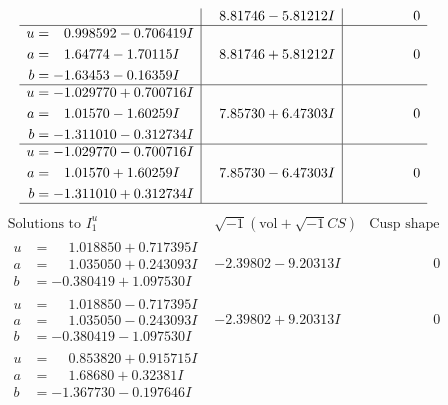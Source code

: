 \documentclass[1p]{elsarticle_modified}
\theoremstyle{definition}
\newcommand{\I}{\sqrt{-1}}
\begin{document}
$$\begin{array}{c|c|c}
 & \phantom{-}8.81746 - 5.81212 I & \phantom{-0.000000 } 0 \\ \hline\begin{aligned}
u &= \phantom{-}0.998592 - 0.706419 I \\
a &= \phantom{-}1.64774 - 1.70115 I \\
b &= -1.63453 - 0.16359 I\end{aligned}
 & \phantom{-}8.81746 + 5.81212 I & \phantom{-0.000000 } 0 \\ \hline\begin{aligned}
u &= -1.029770 + 0.700716 I \\
a &= \phantom{-}1.01570 - 1.60259 I \\
b &= -1.311010 - 0.312734 I\end{aligned}
 & \phantom{-}7.85730 + 6.47303 I & \phantom{-0.000000 } 0 \\ \hline\begin{aligned}
u &= -1.029770 - 0.700716 I \\
a &= \phantom{-}1.01570 + 1.60259 I \\
b &= -1.311010 + 0.312734 I\end{aligned}
 & \phantom{-}7.85730 - 6.47303 I & \phantom{-0.000000 } 0\\
 \hline 
 \end{array}$$\newpage$$\begin{array}{c|c|c}  
\text{Solutions to }I^u_{1}& \I (\text{vol} + \sqrt{-1}CS) & \text{Cusp shape}\\
 \hline 
\begin{aligned}
u &= \phantom{-}1.018850 + 0.717395 I \\
a &= \phantom{-}1.035050 + 0.243093 I \\
b &= -0.380419 + 1.097530 I\end{aligned}
 & -2.39802 - 9.20313 I & \phantom{-0.000000 } 0 \\ \hline\begin{aligned}
u &= \phantom{-}1.018850 - 0.717395 I \\
a &= \phantom{-}1.035050 - 0.243093 I \\
b &= -0.380419 - 1.097530 I\end{aligned}
 & -2.39802 + 9.20313 I & \phantom{-0.000000 } 0 \\ \hline\begin{aligned}
u &= \phantom{-}0.853820 + 0.915715 I \\
a &= \phantom{-}1.68680 + 0.32381 I \\
b &= -1.367730 - 0.197646 I\end{aligned}

\end{array}$$
\end{document}
